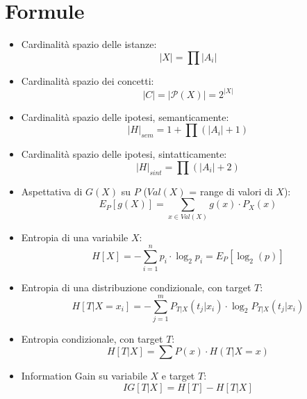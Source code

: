 \documentclass[a4paper,12pt, oneside]{article}
\title{}
\author{}
\date{}
\begin{document}

\newtheorem{teorema}{Teorema}
\newtheorem{definizione}{Definizione}
\newtheorem{esempio}{Esempio}
\newtheorem{corollario}{Corollario}
\newtheorem{lemma}{Lemma}
\newtheorem{osservazione}{Osservazione}
\newtheorem{nota}{Nota}
\newtheorem{esercizio}{Esercizio}

\renewcommand{\sectionmark}[1]{\markright{\thesection.\ #1}}
\allsectionsfont{\centering}
\section*{Formule}
\begin{itemize}
  \item Cardinalità spazio delle istanze:
  \[|X|=\prod |A_i|\]
  \item Cardinalità spazio dei concetti:
  \[|C|=|\mathcal{P}(X)|=2^{|X|}\]
  \item Cardinalità spazio delle ipotesi, semanticamente:
  \[|H|_{sem}=1+\prod (|A_i|+1)\]
  \item Cardinalità spazio delle ipotesi, sintatticamente:
  \[|H|_{sint}=\prod (|A_i|+2)\]
  \item Aspettativa di $G(X)$ su $P$ ($Val(X)$ = range di valori di $X$):
  \[E_P[g(X)]=\sum_{x\in Val(X)} g(x)\cdot P_X(x)\]
  \item Entropia di una variabile $X$:
  \[H[X]=-\sum_{i=1}^n p_i\cdot\log_2 p_i=E_P[\log_2(p)]\]
  \item Entropia di una distribuzione condizionale, con target $T$:
  \[H[T|X=x_i]=-\sum_{j=1}^m P_{T|X}(t_j|x_i)\cdot \log_2 P_{T|X}(t_j|x_i)\]
  \item Entropia condizionale, con target $T$:
  \[H[T|X]=\sum P(x)\cdot H(T|X=x)\]
  \item Information Gain su variabile $X$ e target $T$:
  \[IG[T|X]=H[T]-H[T|X]\]

\end{itemize}
\end{document}
